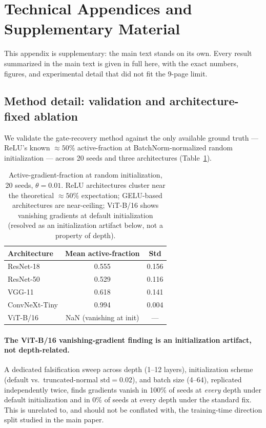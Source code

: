 \section{Technical Appendices and Supplementary Material}

This appendix is supplementary: the main text stands on its own. Every
result summarized in the main text is given in full here, with the exact
numbers, figures, and experimental detail that did not fit the 9-page
limit.

\subsection{Method detail: validation and architecture-fixed ablation}
\label{app:method-detail}

We validate the gate-recovery method against the only available ground
truth --- ReLU's known $\approx\!50\%$ active-fraction at
BatchNorm-normalized random initialization --- across 20 seeds and three
architectures (Table~\ref{tab:init_profile}).

\begin{table}[h]
\centering
\caption{Active-gradient-fraction at random initialization, 20 seeds,
$\theta=0.01$. ReLU architectures cluster near the theoretical $\approx 50\%$
expectation; GELU-based architectures are near-ceiling; ViT-B/16 shows
vanishing gradients at default initialization (resolved as an
initialization artifact below, not a property of depth).}
\label{tab:init_profile}
\begin{tabular}{lcc}
\toprule
Architecture & Mean active-fraction & Std\\
\midrule
ResNet-18 & 0.555 & 0.156\\
ResNet-50 & 0.529 & 0.116\\
VGG-11 & 0.618 & 0.141\\
ConvNeXt-Tiny & 0.994 & 0.004\\
ViT-B/16 & NaN (vanishing at init) & ---\\
\bottomrule
\end{tabular}
\end{table}

\paragraph{The ViT-B/16 vanishing-gradient finding is an initialization
artifact, not depth-related.} A dedicated falsification sweep across depth
(1--12 layers), initialization scheme (default vs.\ truncated-normal
$\mathrm{std}=0.02$), and batch size (4--64), replicated independently
twice, finds gradients vanish in 100\% of seeds at \emph{every} depth under
default initialization and in 0\% of seeds at every depth under the
standard fix. This is unrelated to, and should not be conflated with, the
training-time direction split studied in the main paper.

